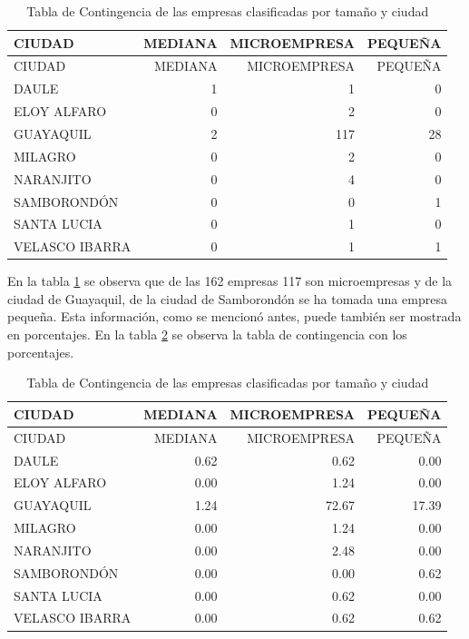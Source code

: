 \documentclass[]{book}
\newenvironment{Shaded}{\begin{snugshade}}{\end{snugshade}}
\newcommand{\KeywordTok}[1]{\textcolor[rgb]{0.13,0.29,0.53}{\textbf{#1}}}
\newcommand{\DataTypeTok}[1]{\textcolor[rgb]{0.13,0.29,0.53}{#1}}
\newcommand{\DecValTok}[1]{\textcolor[rgb]{0.00,0.00,0.81}{#1}}
\newcommand{\StringTok}[1]{\textcolor[rgb]{0.31,0.60,0.02}{#1}}
\newcommand{\OperatorTok}[1]{\textcolor[rgb]{0.81,0.36,0.00}{\textbf{#1}}}
\newcommand{\NormalTok}[1]{#1}
\begin{document}
\begin{longtable}[]{@{}lrrr@{}}
\caption{\label{tab:tabla4}Tabla de Contingencia de las empresas
clasificadas por tamaño y ciudad}\tabularnewline
\toprule
CIUDAD & MEDIANA & MICROEMPRESA & PEQUEÑA\tabularnewline
\midrule
\endfirsthead
\toprule
CIUDAD & MEDIANA & MICROEMPRESA & PEQUEÑA\tabularnewline
\midrule
\endhead
DAULE & 1 & 1 & 0\tabularnewline
ELOY ALFARO & 0 & 2 & 0\tabularnewline
GUAYAQUIL & 2 & 117 & 28\tabularnewline
MILAGRO & 0 & 2 & 0\tabularnewline
NARANJITO & 0 & 4 & 0\tabularnewline
SAMBORONDÓN & 0 & 0 & 1\tabularnewline
SANTA LUCIA & 0 & 1 & 0\tabularnewline
VELASCO IBARRA & 0 & 1 & 1\tabularnewline
\bottomrule
\end{longtable}

En la tabla \ref{tab:tabla4} se observa que de las 162 empresas 117 son
microempresas y de la ciudad de Guayaquil, de la ciudad de Samborondón
se ha tomada una empresa pequeña. Esta información, como se mencionó
antes, puede también ser mostrada en porcentajes. En la tabla
\ref{tab:tabla5} se observa la tabla de contingencia con los
porcentajes.

\begin{Shaded}
\end{Shaded}

\begin{longtable}[]{@{}lrrr@{}}
\caption{\label{tab:tabla5}Tabla de Contingencia de las empresas
clasificadas por tamaño y ciudad}\tabularnewline
\toprule
CIUDAD & MEDIANA & MICROEMPRESA & PEQUEÑA\tabularnewline
\midrule
\endfirsthead
\toprule
CIUDAD & MEDIANA & MICROEMPRESA & PEQUEÑA\tabularnewline
\midrule
\endhead
DAULE & 0.62 & 0.62 & 0.00\tabularnewline
ELOY ALFARO & 0.00 & 1.24 & 0.00\tabularnewline
GUAYAQUIL & 1.24 & 72.67 & 17.39\tabularnewline
MILAGRO & 0.00 & 1.24 & 0.00\tabularnewline
NARANJITO & 0.00 & 2.48 & 0.00\tabularnewline
SAMBORONDÓN & 0.00 & 0.00 & 0.62\tabularnewline
SANTA LUCIA & 0.00 & 0.62 & 0.00\tabularnewline
VELASCO IBARRA & 0.00 & 0.62 & 0.62\tabularnewline
\bottomrule
\end{longtable}
\end{document}
